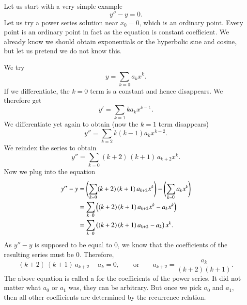 \documentclass[12pt]{book}
\begin{document}
\begin{example}
Let us start with a very simple example
\begin{equation*}
y'' - y = 0 .
\end{equation*}
Let us try a power series solution near $x_0 = 0$,
which is an ordinary point.  Every point is an ordinary
point in fact as the equation is constant coefficient.  We already know
we should obtain exponentials or the hyperbolic sine and cosine,
but let us pretend we do not know this.

We try
\begin{equation*}
y = \sum_{k=0} a_k x^k .
\end{equation*}
If we differentiate, the $k=0$ term is a constant and hence disappears.
We therefore get
\begin{equation*}
y' = \sum_{k=1} k a_k x^{k-1} .
\end{equation*}
We differentiate yet again to obtain (now the $k=1$ term disappears)
\begin{equation*}
y'' = \sum_{k=2} k(k-1) a_k x^{k-2} .
\end{equation*}
We reindex the series to obtain
\begin{equation*}
y'' = \sum_{k=0} (k+2)\,(k+1) \, a_{k+2} x^k .
\end{equation*}
Now we plug into the equation
\begin{equation*}
\begin{split}
y''-y & = 
\Biggl( \sum_{k=0} (k+2)\,(k+1) \, a_{k+2} x^k  \Biggr)
-
\Biggl( \sum_{k=0} a_k x^k \Biggr)
\\
& =
\sum_{k=0} \,\Bigl( (k+2)\,(k+1) \, a_{k+2} x^k 
-
a_k x^k \Bigr)
\\
& =
\sum_{k=0} \,\bigl( (k+2)\,(k+1) \,a_{k+2} - a_k \bigr) \, x^k  .
\end{split}
\end{equation*}
As $y'' - y$ is supposed to be equal to 0, we know that the
coefficients of the resulting series must be 0.  Therefore,
\begin{equation*}
(k+2)\,(k+1) \,a_{k+2} - a_k = 0 ,
\qquad
\text{or}
\qquad
a_{k+2} = \frac{a_k}{(k+2)(k+1)} .
\end{equation*}
The above equation is called a \emph{}
for the coefficients of the power series.
It did not matter what $a_0$ or $a_1$ was, they can be arbitrary.
But once we pick $a_0$ and $a_1$, then all other coefficients are
determined by the recurrence relation.


\end{example}
\end{document}
